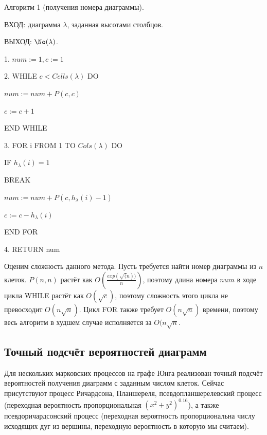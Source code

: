 \documentclass[12pt]{report}
\begin{document}
Алгоритм 1 (получения номера диаграммы).

ВХОД: диаграмма $\lambda$, заданная высотами столбцов.

ВЫХОД: $\No(\lambda)$.

1. $num := 1, c := 1$ 

2. WHILE $c < Cells(\lambda)$ DO 

\hspace{1cm} $num := num + P(c, c)$

\hspace{1cm} $c := c + 1$

\hspace{0.35cm} END WHILE

3. FOR i FROM 1 TO $Cols(\lambda)$ DO

\hspace{1cm} IF $h_\lambda(i) = 1$

\hspace{2cm} BREAK

\hspace{1cm} $num := num + P(c, h_\lambda(i) - 1)$

\hspace{1cm} $c := c - h_\lambda(i)$

\hspace{0.35cm} END FOR

4. RETURN num

Оценим сложность данного метода. Пусть требуется найти номер диаграммы из $n$ клеток. $P(n, n)$ растёт как $O(\frac{exp(\sqrt(n))}{n})$, поэтому длина номера $num$ в ходе цикла WHILE растёт как $O(\sqrt{c})$, поэтому сложность этого цикла не превосходит $O(n\sqrt{n})$. Цикл FOR также требует $O(n\sqrt{n})$ времени, поэтому весь алгоритм в худшем случае исполняется за $O(n\sqrt{n}$.

\subsection*{Точный подсчёт вероятностей диаграмм}

\hspace{\parindent} Для нескольких марковских процессов на графе Юнга реализован точный подсчёт вероятностей получения диаграмм с заданным числом клеток. Сейчас присутствуют процесс Ричардсона, Планшереля, псевдопланшерелевский процесс (переходная вероятность пропорциональная $(x^2+y^2)^{0.16}$), а также псевдоричардсонский процесс (переходная вероятность пропорциональна числу исходящих дуг из вершины, переходную вероятность в которую мы считаем). 
\end{document}
